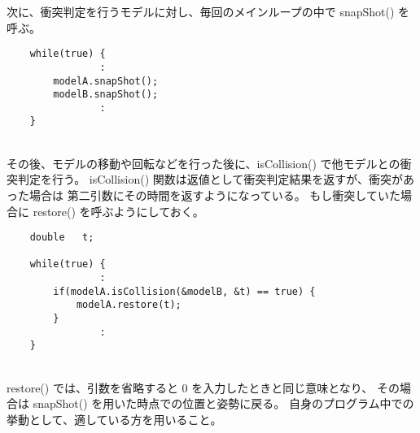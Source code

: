 次に、衝突判定を行うモデルに対し、毎回のメインループの中で snapShot() を呼ぶ。
\\
\begin{breakbox}
\begin{verbatim}
    while(true) {
                :
        modelA.snapShot();
        modelB.snapShot();
                :
    }
\end{verbatim}
\end{breakbox}
~ \\
その後、モデルの移動や回転などを行った後に、isCollision() で他モデルとの衝突判定を行う。
isCollision() 関数は返値として衝突判定結果を返すが、衝突があった場合は
第二引数にその時間を返すようになっている。
もし衝突していた場合に restore() を呼ぶようにしておく。
\\
\begin{breakbox}
\begin{verbatim}
    double   t;

    while(true) {
                :
        if(modelA.isCollision(&modelB, &t) == true) {
            modelA.restore(t);
        }
                :
    }
\end{verbatim}
\end{breakbox}
~ \\
restore() では、引数を省略すると 0 を入力したときと同じ意味となり、
その場合は snapShot() を用いた時点での位置と姿勢に戻る。
自身のプログラム中での挙動として、適している方を用いること。
